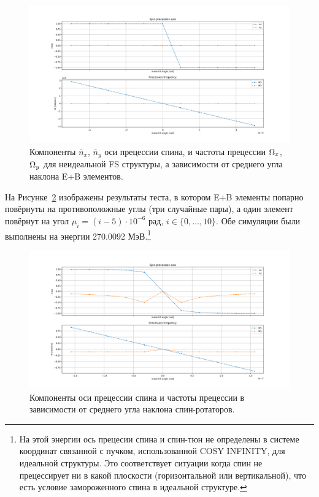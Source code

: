 \begin{figure}[!h]
	\centering\hfill
	\includegraphics[width=\textwidth]{images/fake_signal_sim/linearity_test_shifting_gauss}
	\hfill
	\caption{Компоненты $\bar n_x$, $\bar n_y$ оси прецессии спина, и частоты прецессии $\Omega_x$, $\Omega_y$ для неидеальной FS структуры, а зависимости от среднего угла наклона E+B элементов.\label{fig:Linearity_test_shifting_gauss}}
\end{figure}

На Рисунке~\ref{fig:Linearity_test_compensated} изображены результаты теста, в котором E+B элементы попарно повёрнуты на противоположные углы (три случайные пары), а один элемент повёрнут на угол
$\mu_i = (i-5)\cdot 10^{-6}$ рад, $i\in\lbrace0,\dots,10\rbrace$. Обе симуляции были выполнены на энергии
270.0092 МэВ.\footnote{На этой энергии ось прецесии спина и спин-тюн
	не определены в системе координат связанной с пучком, использованной
	COSY INFINITY, для идеальной структуры. Это соответствует ситуации
	когда спин не прецессирует ни в какой плоскости (горизонтальной или
	вертикальной), что есть условие замороженного спина в идеальной структуре.}

\begin{figure}[!h]
	\centering\hfill
	\includegraphics[width=\textwidth]{images/fake_signal_sim/linearity_test_compensated+microrad}
	\hfill
	\caption{Компоненты оси прецессии спина и частоты прецессии в зависимости от среднего угла наклона спин-ротаторов.\label{fig:Linearity_test_compensated}}
\end{figure}

